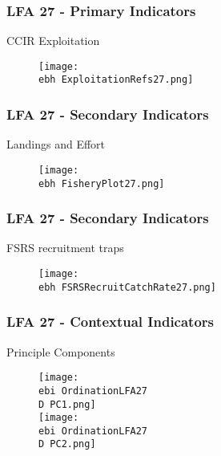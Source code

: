 \documentclass{beamer}
\newcommand{\ebh}{\string~/bio.data/bio.lobster/figures/Assessment/LFA2732/} %
\newcommand{\ebi}{\string~/bio.data/bio.lobster/figures/Assessment/Indicators/} %
\newcommand{\D}{.}
\begin{document}
\begin{frame}
\frametitle{LFA 27 - Primary Indicators}
CCIR Exploitation 
\begin{figure}
        \begin{center}
            \texttt{[image: \\ebh ExploitationRefs27.png]}
        \end{center}
    \end{figure}
\end{frame}




\begin{frame}
\frametitle{LFA 27 - Secondary Indicators}
Landings and Effort
\begin{figure}
        \begin{center}
            \texttt{[image: \\ebh FisheryPlot27.png]}
        \end{center}
    \end{figure}
\end{frame}



\begin{frame}
\frametitle{LFA 27 - Secondary Indicators}
FSRS recruitment traps
\begin{figure}
        \begin{center}
            \texttt{[image: \\ebh FSRSRecruitCatchRate27.png]}
        \end{center}
    \end{figure}
\end{frame}



\begin{frame}
\frametitle{LFA 27 - Contextual Indicators}
Principle Components
\begin{figure}
        \begin{center}
            \texttt{[image: \\ebi OrdinationLFA27\\D PC1.png]}\\
            \texttt{[image: \\ebi OrdinationLFA27\\D PC2.png]}
        \end{center}
    \end{figure}
\end{frame}
\end{document}
